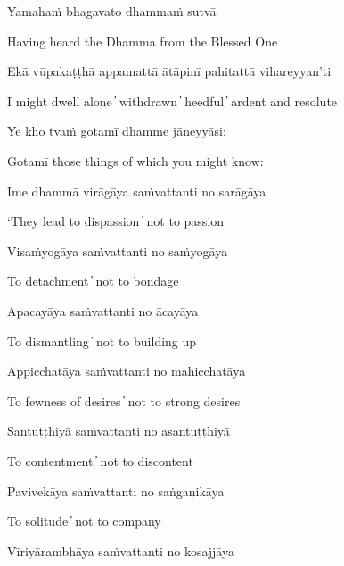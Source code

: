 Yamahaṁ bhagavato dhammaṁ sutvā

\begin{cprenglish}
  Having heard the Dhamma from the Blessed One
\end{cprenglish}

Ekā vūpakaṭṭhā appamattā ātāpinī pahitattā vihareyyan’ti

\begin{cprenglish}
  I might dwell alone  ̓  withdrawn  ̓  heedful  ̓  ardent and resolute
\end{cprenglish}

Ye kho tvaṁ gotamī dhamme jāneyyāsi:

\begin{cprenglish}
  Gotamī those things of which you might know:
\end{cprenglish}

Ime dhammā virāgāya saṁvattanti no sarāgāya

\begin{cprenglish}
  ‘They lead to dispassion  ̓  not to passion
\end{cprenglish}

Visaṁyogāya saṁvattanti no saṁyogāya

\begin{cprenglish}
  To detachment  ̓  not to bondage
\end{cprenglish}

Apacayāya saṁvattanti no ācayāya

\begin{cprenglish}
  To dismantling  ̓  not to building up
\end{cprenglish}

Appicchatāya saṁvattanti no mahicchatāya

\begin{cprenglish}
  To fewness of desires  ̓  not to strong desires
\end{cprenglish}

Santuṭṭhiyā saṁvattanti no asantuṭṭhiyā

\begin{cprenglish}
  To contentment  ̓  not to discontent
\end{cprenglish}

Pavivekāya saṁvattanti no saṅgaṇikāya

\begin{cprenglish}
  To solitude  ̓  not to company
\end{cprenglish}

Vīriyārambhāya saṁvattanti no kosajjāya

